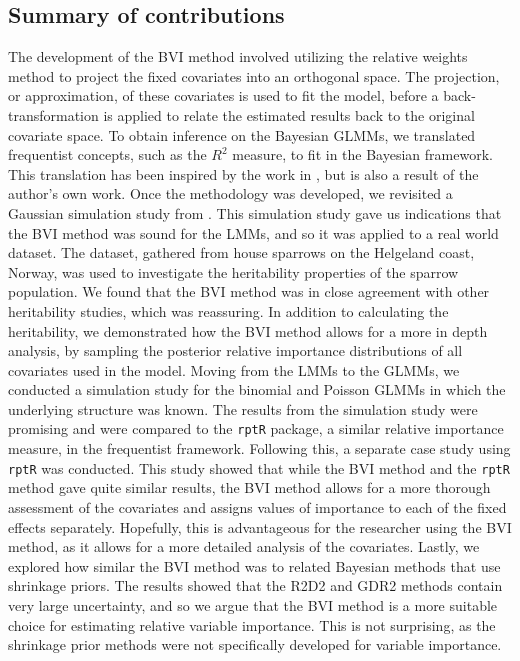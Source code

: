 \subsection*{Summary of contributions} 
The development of the BVI method involved utilizing the relative weights method \citep{johnson_relative_weights} to project the fixed covariates into an orthogonal space. The projection, or approximation, of these covariates is used to fit the model, before a back-transformation is applied to relate the estimated results back to the original covariate space. To obtain inference on the Bayesian GLMMs, we translated frequentist concepts, such as the $R^2$ measure, to fit in the Bayesian framework. This translation has been inspired by the work in \citet{gelman2017rsquared}, but is also a result of the author's own work. Once the methodology was developed, we revisited a Gaussian simulation study from \citet{Arnstad:Relative_variable_importance_in_Bayesian_linear_mixed_models:2024}. This simulation study gave us indications that the BVI method was sound for the LMMs, and so it was applied to a real world dataset. The dataset, gathered from house sparrows on the Helgeland coast, Norway, was used to investigate the heritability properties of the sparrow population. We found that the BVI method was in close agreement with other heritability studies, which was reassuring. In addition to calculating the heritability, we demonstrated how the BVI method allows for a more in depth analysis, by sampling the posterior relative importance distributions of all covariates used in the model. Moving from the LMMs to the GLMMs, we conducted a simulation study for the binomial and Poisson GLMMs in which the underlying structure was known. The results from the simulation study were promising and were compared to the \texttt{rptR} package, a similar relative importance measure, in the frequentist framework. Following this, a separate case study using \texttt{rptR} was conducted. This study showed that while the BVI method and the \texttt{rptR} method gave quite similar results, the BVI method allows for a more thorough assessment of the covariates and assigns values of importance to each of the fixed effects separately. Hopefully, this is advantageous for the researcher using the BVI method, as it allows for a more detailed analysis of the covariates. Lastly, we explored how similar the BVI method was to related Bayesian methods that use shrinkage priors. The results showed that the R2D2 and GDR2 methods contain very large uncertainty, and so we argue that the BVI method is a more suitable choice for estimating relative variable importance. This is not surprising, as the shrinkage prior methods were not specifically developed for variable importance. 
